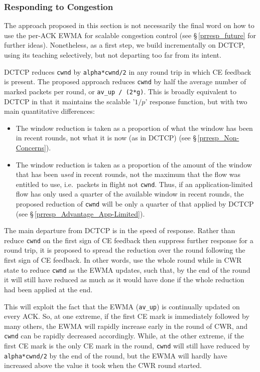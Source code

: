 \subsubsection{Responding to Congestion}\label{prresp_congestion_response}

The approach proposed in this section is not necessarily the final word on how to use the per-ACK EWMA for scalable congestion control (see \S\,\ref{prresp_future} for further ideas). Nonetheless, as a first step, we build incrementally on DCTCP, using its teaching selectively, but not departing too far from its intent. 

DCTCP reduces \texttt{cwnd} by \texttt{alpha*cwnd/2} in any round trip in which CE feedback is present. The proposed approach reduces \texttt{cwnd} by half the average number of marked packets per round, or \texttt{av\_up / (2*g)}. This is broadly equivalent to DCTCP in that it maintains the scalable '\(1/p\)' response function, but with two main quantitative differences:
\begin{itemize}[nosep]
	\item The window reduction is taken as a proportion of what the window has been in recent rounds, not what it is now (as in DCTCP) (see \S\,\ref{prresp_Non-Concerns}).
	\item The window reduction is taken as a proportion of the amount of the window that has been \emph{used} in recent rounds, not the maximum that the flow was entitled to use, i.e.\ packets in flight not \texttt{cwnd}. Thus, if an application-limited flow has only used a quarter of the available window in recent rounds, the proposed reduction of \texttt{cwnd} will be only a quarter of that applied by DCTCP (see \S\,\ref{prresp_Advantage_App-Limited}).
\end{itemize}

The main departure from DCTCP is in the speed of response. Rather than reduce  \texttt{cwnd} on the first sign of CE feedback then suppress further response for a round trip, it is proposed to spread the reduction over the round following the first sign of CE feedback. In other words, use the whole round while in CWR state to reduce \texttt{cwnd} as the EWMA updates, such that, by the end of the round it will still have reduced as much as it would have done if the whole reduction had been applied at the end.

This will exploit the fact that the EWMA (\texttt{av\_up}) is continually updated on every ACK. So, at one extreme, if the first CE mark is immediately followed by many others, the EWMA will rapidly increase early in the round of CWR, and \texttt{cwnd} can be rapidly decreased accordingly. While, at the other extreme, if the first CE mark is the only CE mark in the round, \texttt{cwnd} will still have reduced by \texttt{alpha*cwnd/2} by the end of the round, but the EWMA will hardly have increased above the value it took when the CWR round started.


